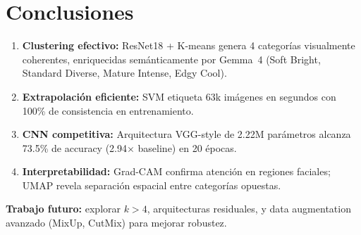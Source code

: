 \documentclass[10pt,a4paper]{article}
\begin{document}
\section{Conclusiones}

\begin{enumerate}[leftmargin=*,itemsep=2pt]
\item \textbf{Clustering efectivo:} ResNet18 + K-means genera 4 categorías visualmente coherentes, enriquecidas semánticamente por Gemma~4 (Soft Bright, Standard Diverse, Mature Intense, Edgy Cool).
\item \textbf{Extrapolación eficiente:} SVM etiqueta 63k imágenes en segundos con 100\% de consistencia en entrenamiento.
\item \textbf{CNN competitiva:} Arquitectura VGG-style de 2.22M parámetros alcanza 73.5\% de accuracy (2.94$\times$ baseline) en 20 épocas.
\item \textbf{Interpretabilidad:} Grad-CAM confirma atención en regiones faciales; UMAP revela separación espacial entre categorías opuestas.
\end{enumerate}

\noindent\textbf{Trabajo futuro:} explorar $k>4$, arquitecturas residuales, y data augmentation avanzado (MixUp, CutMix) para mejorar robustez.



\end{document}

